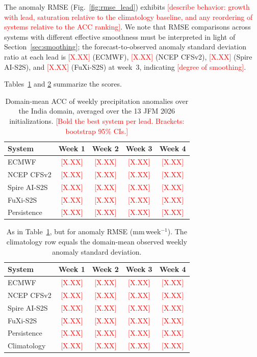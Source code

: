 \documentclass[11pt]{article}
\newcommand{\ph}[1]{\textcolor{red}{[#1]}}
\newcommand{\phnum}{\textcolor{red}{[X.XX]}}
\begin{document}
The anomaly RMSE (Fig.~\ref{fig:rmse_lead}) exhibits \ph{describe
behavior: growth with lead, saturation relative to the climatology
baseline, and any reordering of systems relative to the ACC ranking}.
We note that RMSE comparisons across systems with different effective
smoothness must be interpreted in light of
Section~\ref{sec:smoothing}; the forecast-to-observed anomaly standard
deviation ratio at each lead is \phnum{} (ECMWF), \phnum{} (NCEP
CFSv2), \phnum{} (Spire AI-S2S), and \phnum{} (FuXi-S2S) at week~3,
indicating \ph{degree of smoothing}.

Tables~\ref{tab:acc} and \ref{tab:rmse} summarize the scores.

\begin{table}[t]
  \centering
  \caption{Domain-mean ACC of weekly precipitation anomalies over the
  India domain, averaged over the 13 JFM 2026 initializations.
  \ph{Bold the best system per lead. Brackets: bootstrap 95\% CIs.}}
  \label{tab:acc}
  \begin{tabular}{lcccc}
    \toprule
    System & Week 1 & Week 2 & Week 3 & Week 4 \\
    \midrule
    ECMWF        & \phnum & \phnum & \phnum & \phnum \\
    NCEP CFSv2   & \phnum & \phnum & \phnum & \phnum \\
    Spire AI-S2S & \phnum & \phnum & \phnum & \phnum \\
    FuXi-S2S     & \phnum & \phnum & \phnum & \phnum \\
    Persistence  & \phnum & \phnum & \phnum & \phnum \\
    \bottomrule
  \end{tabular}
\end{table}

\begin{table}[t]
  \centering
  \caption{As in Table~\ref{tab:acc}, but for anomaly RMSE
  (mm\,week$^{-1}$). The climatology row equals the domain-mean
  observed weekly anomaly standard deviation.}
  \label{tab:rmse}
  \begin{tabular}{lcccc}
    \toprule
    System & Week 1 & Week 2 & Week 3 & Week 4 \\
    \midrule
    ECMWF        & \phnum & \phnum & \phnum & \phnum \\
    NCEP CFSv2   & \phnum & \phnum & \phnum & \phnum \\
    Spire AI-S2S & \phnum & \phnum & \phnum & \phnum \\
    FuXi-S2S     & \phnum & \phnum & \phnum & \phnum \\
    Persistence  & \phnum & \phnum & \phnum & \phnum \\
    Climatology  & \phnum & \phnum & \phnum & \phnum \\
    \bottomrule
  \end{tabular}
\end{table}
\end{document}
